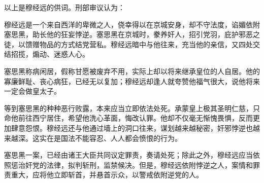 以上是穆经远的供词。刑部审议认为：\par
穆经远是一个来自西洋的卑微之人，侥幸得以在京城安身，却不守法度，谄媚依附塞思黑，助长他的狂妄悖逆。塞思黑在京城时，豢养奸人，招引党羽，庇护邪恶之徒，以馈赠物品的方式结党营私。穆经远暗中与他往来，充当他的亲信，又四处交结招揽，煽动、迷惑人心。\par
塞思黑称病闲居，假称甘愿被废弃不用，实际上却以将来继承皇位的人自居。他的寡廉鲜耻、丧心病狂，已经无以复加；穆经远却逢人就夸赞他福气很大，说他将来一定会做皇太子。\par
等到塞思黑的种种恶行败露，本来应当立即依法处死。承蒙皇上极其圣明仁慈，只命他前往西宁居住，希望他洗心革面，悔改认罪。他却不仅毫无惭愧畏惧，反而更加肆意怨恨。穆经远还与他通过墙上的洞口往来，谋划越来越秘密，奸邪悖逆也越来越深。这实在是国法不能容忍、人人都会愤恨的行为。\par
塞思黑一案，已经由诸王大臣共同议定罪责，奏请处死；除此之外，穆经远应当依照惩治奸党的法律，拟判斩刑，监禁候决。但是，穆经远依附悖逆之人，案情和罪责重大，应将他立即斩首，并悬首示众，以警戒依附逆党的人。\par
\par\endgroup
\clearpage\label{replacement-end}\endgroup
